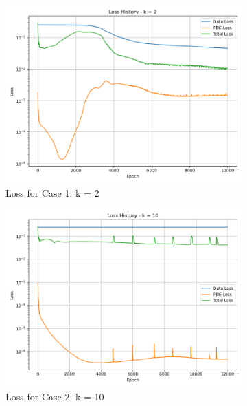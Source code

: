 \documentclass[11pt]{article}
\begin{document}
\begin{figure}[h!]
    \centering
    \begin{subfigure}[b]{0.48\textwidth}
        \includegraphics[width=\textwidth]{2D_Loss_K1.png}
        \caption{Loss for Case 1: k = 2}
        \label{fig:Loss_K1}
    \end{subfigure}
    \hfill
    \begin{subfigure}[b]{0.48\textwidth}
        \includegraphics[width=\textwidth]{2D_Loss_K2.png}
        \caption{Loss for Case 2: k = 10}
        \label{fig:Loss_K2}
    \end{subfigure}
    \hfill
    \begin{subfigure}[b]{0.48\textwidth}

\end{subfigure}
\end{figure}
\end{document}
